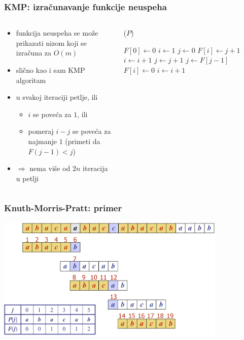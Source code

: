 \documentclass[compress]{beamer}
\begin{document}
\begin{frame}[fragile,shrink=12]
  \frametitle{KMP: izračunavanje funkcije neuspeha}
  \begin{columns}
    \begin{column}[t]{6cm}
      \begin{itemize}
        \item funkcija neuspeha se može prikazati nizom koji se izračuna za $O(m)$
        \item slično kao i sam KMP algoritam
        \item u svakoj iteraciji petlje, ili
        \begin{itemize}
          \item $i$ se poveća za $1$, ili
          \item pomeraj $i-j$ se poveća za najmanje $1$ (primeti da $F(j-1)<j$)
        \end{itemize}
        \item $\Rightarrow$ nema više od $2n$ iteracija u petlji
      \end{itemize}
    \end{column}
    \begin{column}[t]{6cm}
      ($P$)
      \begin{algorithmic}
        \STATE $F[0] \leftarrow 0$
        \STATE $i \leftarrow 1$
        \STATE $j \leftarrow 0$
            \STATE {}
            \STATE $F[i] \leftarrow j+1$
            \STATE $i \leftarrow i+1$
            \STATE $j \leftarrow j+1$
            \STATE {}
            \STATE $j \leftarrow F[j-1]$
          \ELSE
            \STATE $F[i] \leftarrow 0$ 
            \STATE $i \leftarrow i + 1$
          \ENDIF
        \ENDWHILE
      \end{algorithmic}    
    \end{column}
  \end{columns}
\end{frame}

\begin{frame}[fragile]
  \frametitle{Knuth-Morris-Pratt: primer}
  \begin{center}
    \includegraphics[width=11cm]{asp-13-pic07.png}
  \end{center}
\end{frame}
\end{document}
